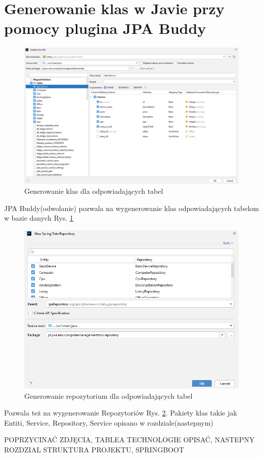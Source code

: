 \section{Generowanie klas w Javie przy pomocy plugina JPA Buddy}

 


\begin{figure}[h]
		\centering
    \includegraphics[scale=0.4]{rys05/generate_entities.png}
    \caption{Generowanie klas dla odpowiadających tabel}
    \label{entities_etykieta}
\end{figure}

JPA Buddy(odwolanie) pozwala na wygenerowanie klas odpowiadających tabelom w bazie danych Rys. \ref{entities_etykieta}

\newpage
\begin{figure}[h]
    \includegraphics[scale=0.6]{rys05/generate_repository.png}
    \caption{Generowanie repozytorium dla odpowiadających tabel}
    \label{repository_etykieta}
\end{figure}

Pozwala też na wygenerowanie Repozytoriów Rys. \ref{repository_etykieta}. Pakiety klas takie jak Entiti, Service, Repository, Service opisano w rozdziale(nastepnym)


POPRZYCINAĆ ZDJĘCIA, TABLEA TECHNOLOGIE OPISAĆ, NASTEPNY ROZDZIAL STRUKTURA PROJEKTU, SPRINGBOOT


















